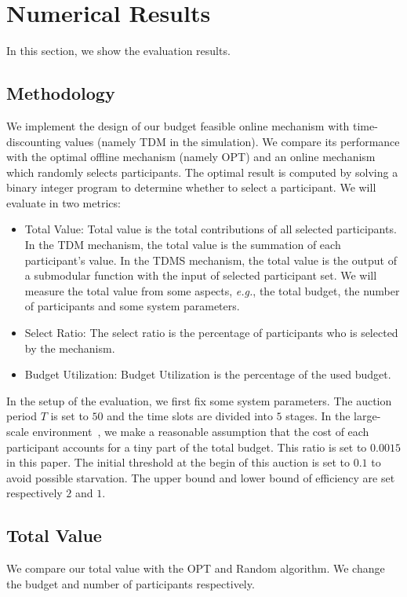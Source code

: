 \documentclass[conference,compsocconf,letterpaper,10pt]{IEEEtran}
\newcommand{\eg}{{\em e.g.}}
\begin{document}
\section{Numerical Results}
In this section, we show the evaluation results.
\subsection{Methodology}
We implement the design of our budget feasible online mechanism with time-discounting values (namely TDM in the simulation). We compare its performance with the optimal offline mechanism (namely OPT) and an online mechanism which randomly selects participants. The optimal result is computed by solving a binary integer program to determine whether to select a participant. We will evaluate in two metrics:
\begin{itemize}
\item Total Value: Total value is the total contributions of all selected participants. In the TDM mechanism, the total value is the summation of each participant's value. In the TDMS mechanism, the total value is the output of a submodular function with the input of selected participant set. We will measure the total value from some aspects, \eg, the total budget, the number of participants and some system parameters.

\item Select Ratio: The select ratio is the percentage of participants who is selected by the mechanism.

\item Budget Utilization: Budget Utilization is the percentage of the used budget.
\end{itemize}
In the setup of the evaluation, we first fix some system parameters. The auction period $T$ is set to $50$ and the time slots are divided into $5$ stages. In the large-scale environment~\cite{6979011}, we make a reasonable assumption that the cost of each participant accounts for a tiny part of the total budget. This ratio  is set to $0.0015$ in this paper. The initial threshold at the begin of this auction is set to $0.1$ to avoid possible starvation. The upper bound and lower bound of efficiency are set respectively $2$ and $1$.
\subsection{Total Value}
We compare our total value with the OPT and Random algorithm. We change the budget and number of participants respectively.
\end{document}
